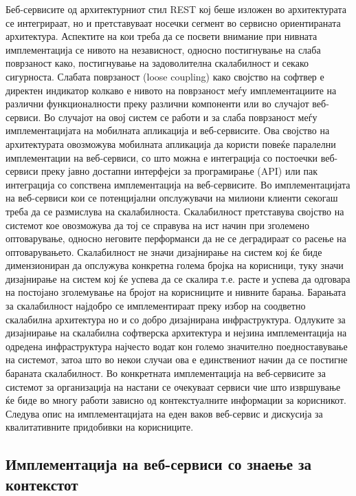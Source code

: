  Беб-сервисите од архитектурниот
стил REST кој беше изложен во архитектурата се интегрираат, но и претставуваат
носечки сегмент во сервисно ориентираната архитектура. Аспектите на кои треба да
се посвети внимание при нивната имплементација се нивото на независност, односно
постигнување на слаба поврзаност како, постигнување на задоволителна
скалабилност и секако сигурноста. Слабата поврзаност (loose coupling) како
својство на софтвер е директен индикатор колкаво е нивото на поврзаност меѓу
имплементациите на различни функционалности преку различни компоненти или во
случајот веб-сервиси. Во случајот на овој систем се работи и за слаба поврзаност
меѓу имплементацијата на мобилната апликација и веб-сервисите. Ова својство на
архитектурата овозможува мобилната апликација да користи повеќе паралелни
имплементации на веб-сервиси, со што можна е интеграција со постоечки
веб-сервиси преку јавно достапни интерфејси за програмирање (API) или пак
интеграција со сопствена имплементација на веб-сервисите. Во имплементацијата на
веб-сервиси кои се потенцијални опслужувачи на милиони клиенти секогаш треба да
се размислува на скалабилноста. Скалабилност претставува својство на системот
кое овозможува да тој се справува на ист начин при зголемено оптоварување,
односно неговите перформанси да не се деградираат со расење на оптоварувањето.
Скалабилност не значи дизајнирање на систем кој ќе биде димензиониран да
опслужува конкретна голема бројка на корисници, туку значи дизајнирање на систем
кој ќе успева да се скалира т.е. расте и успева да одговара на постојано
зголемување на бројот на корисниците и нивните барања. Барањата за скалабилност
најдобро се имплементираат преку избор на соодветно скалабилна архитектура но и
со добро дизајнирана инфраструктура. Одлуките за дизајнирање на скалабилна
софтверска архитектура и нејзина имплементација на одредена инфраструктура
најчесто водат кон големо значително поедноставување на системот, затоа што во
некои случаи ова е единствениот начин да се постигне бараната скалабилност. Во
конкретната имплементација на веб-сервисите за системот за организација на
настани се очекуваат сервиси чие што извршување ќе биде во многу работи зависно
од контекстуалните информации за корисникот. Следува опис на имплементацијата на
еден ваков веб-сервис и дискусија за квалитативните придобивки на корисниците.

\subsection{Имплементација на веб-сервиси со знаење за контекстот} 

